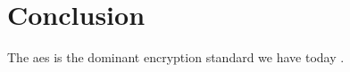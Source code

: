 \chapter{Conclusion}
\lipsum[3]
The \gls{aes} is the dominant encryption standard we have today \parencite{AES}.
